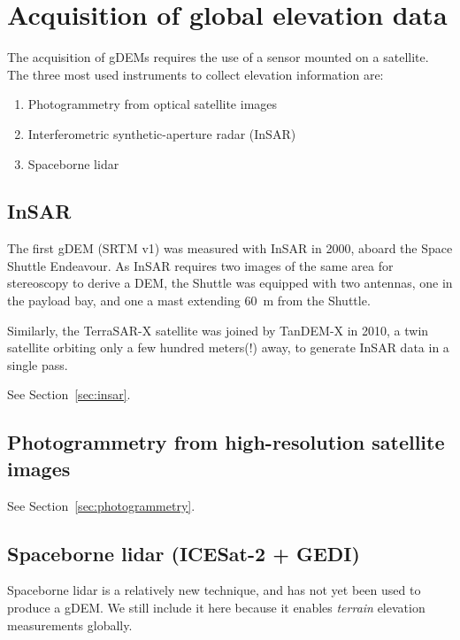 

%
\section[Acquisition of global data]{Acquisition of global elevation data}

The acquisition of gDEMs requires the use of a sensor mounted on a satellite.
The three most used instruments to collect elevation information are:

\begin{enumerate}
  \item Photogrammetry from optical satellite images
  \item Interferometric synthetic-aperture radar (InSAR)
  \item Spaceborne lidar
\end{enumerate}

\subsection{InSAR}

The first gDEM (SRTM v1) was measured with InSAR in 2000, aboard the Space Shuttle Endeavour.
As InSAR requires two images of the same area for stereoscopy to derive a DEM, the Shuttle was equipped with two antennas, one in the payload bay, and one a mast extending \qty{60}{m} from the Shuttle.

Similarly, the TerraSAR-X satellite was joined by TanDEM-X in 2010, a twin satellite orbiting only a few hundred meters(!) away, to generate InSAR data in a single pass.

See Section~\ref{sec:insar}.

\subsection{Photogrammetry from high-resolution satellite images}

See Section~\ref{sec:photogrammetry}.




\subsection{Spaceborne lidar (ICESat-2 + GEDI)}
Spaceborne lidar is a relatively new technique, and has not yet been used to produce a gDEM.
We still include it here because it enables \emph{terrain} elevation measurements globally.

